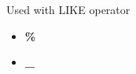 \setlength{\columnsep}{3pt}
\begin{flushleft}
	
	Used with LIKE operator
	\begin{itemize}
		\item \textbf{\%}
		\item \textbf{\_}
	\end{itemize}
	
\end{flushleft}
\newpage